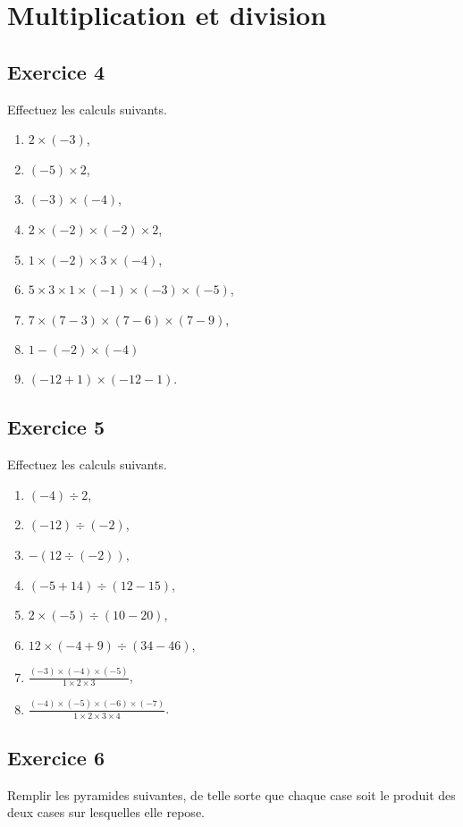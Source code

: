 \documentclass[12 pt]{extarticle}
\theoremstyle{plain}
\begin{document}
\section{Multiplication et division}

\subsection*{Exercice 4}

Effectuez les calculs suivants. 

\begin{enumerate}
\item $ 2 \times (-3 ) $,
\item $ (-5) \times 2$, 
\item $(-3) \times (-4)$, 
\item $2 \times (-2) \times (-2) \times 2$, 
\item $1 \times (-2)\times 3 \times (-4)$, 
\item $5 \times 3 \times 1 \times (-1) \times (-3) \times (-5)$, 
\item $7\times (7-3) \times (7-6) \times (7-9)$, 
\item $1 - (-2) \times (-4) $ 
\item $( - 12  +1) \times (-12-1)$. 
\end{enumerate}
\subsection*{Exercice 5}

Effectuez les calculs suivants. 
\begin{enumerate}
\item $(- 4) \div2$, 
\item $ (-12) \div (-2)$,
\item $ - (12\div (-2))$, 
\item $ (-5 + 14) \div (12 - 15)$, 
\item $2 \times (-5) \div (10-20)$, 
\item $12 \times (-4 + 9) \div (34- 46)$, 
\item $ \frac{(-3) \times (-4) \times (-5)}{1 \times 2 \times 3}$, 
\item $\frac{(-4)\times(-5)\times (-6) \times (-7)}{1\times 2 \times3 \times 4}$.
\end{enumerate}

\subsection*{Exercice 6}
Remplir les pyramides suivantes, de telle sorte que chaque case soit le produit 
des deux cases sur lesquelles elle repose.
\end{document}
